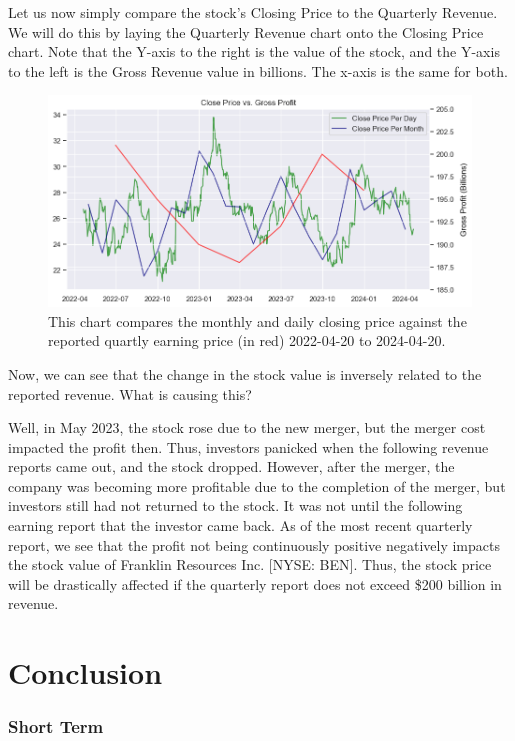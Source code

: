 \documentclass[9pt,a4paper,twoside]{tau}
\begin{document}
        Let us now simply compare the stock's Closing Price to the Quarterly Revenue. We will do this by laying the Quarterly Revenue chart onto the Closing Price chart. Note that the Y-axis to the right is the value of the stock, and the Y-axis to the left is the Gross Revenue value in billions. The x-axis is the same for both.
            \begin{figure}[H]
                \centering
                \includegraphics[width=0.85\columnwidth]{images/CloseDataVsProfit.png}
                \caption{This chart compares the monthly and daily closing price against the reported quartly earning price (in red) 2022-04-20 to 2024-04-20.}
                \label{fig:figure}
            \end{figure}
        
        Now, we can see that the change in the stock value is inversely related to the reported revenue. What is causing this?

        Well, in May 2023, the stock rose due to the new merger, but the merger cost impacted the profit then. Thus, investors panicked when the following revenue reports came out, and the stock dropped. However, after the merger, the company was becoming more profitable due to the completion of the merger, but investors still had not returned to the stock. It was not until the following earning report that the investor came back. As of the most recent quarterly report, we see that the profit not being continuously positive negatively impacts the stock value of Franklin Resources Inc. [NYSE: BEN]. Thus, the stock price will be drastically affected if the quarterly report does not exceed \$200 billion in revenue. 



\section{Conclusion}
    \subsubsection{Short Term}
    
\end{document}
